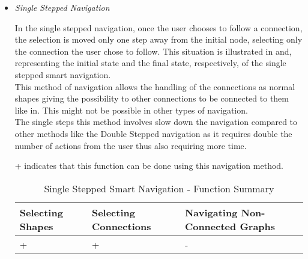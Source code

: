 \begin{itemize}
\item {\it Single Stepped Navigation}
\par \noindent
In the single stepped navigation, once the user chooses to follow a connection, the selection is moved only one step away from the initial node, selecting only the connection the user chose to follow. This situation is illustrated in and, representing the initial state and the final state, respectively, of the single stepped smart navigation.\\
This method of navigation allows the handling of the connections as normal shapes giving the possibility to other connections to be connected to them like in. This might not be possible in other types of navigation.\\
The single steps this method involves slow down the navigation compared to other methods like the Double Stepped navigation as it requires double the number of actions from the user thus also requiring more time.





\begin{table}[H]
\begin{center}
\begin{flushleft}
\footnotesize
{+ indicates that this function can be done using this navigation method.}\\
\end{flushleft}
	\begin{tabular}{| l | l | l |}
	\hline
	Selecting Shapes & Selecting Connections & Navigating Non-Connected Graphs \\ \hline
	+ & + & - \\ \hline
	\end{tabular}
\caption{Single Stepped Smart Navigation - Function Summary}
\end{center}
\end{table}


\end{itemize}
